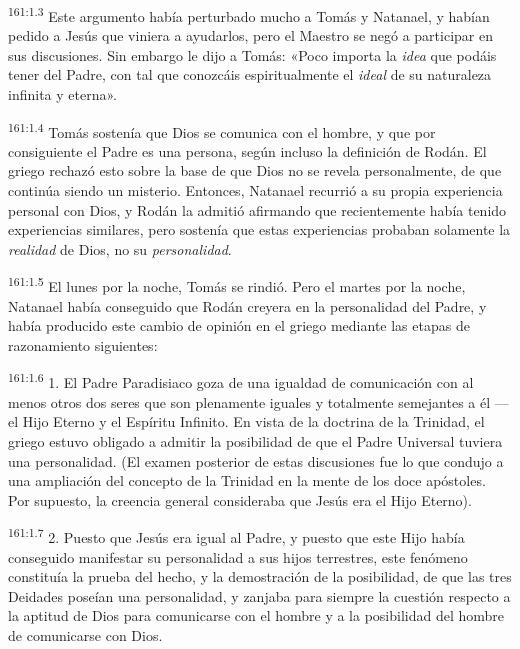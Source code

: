 \par 
\textsuperscript{161:1.3} Este argumento había perturbado mucho a Tomás y Natanael, y habían pedido a Jesús que viniera a ayudarlos, pero el Maestro se negó a participar en sus discusiones. Sin embargo le dijo a Tomás: «Poco importa la \textit{idea} que podáis tener del Padre, con tal que conozcáis espiritualmente el \textit{ideal} de su naturaleza infinita y eterna».

\par 
\textsuperscript{161:1.4} Tomás sostenía que Dios se comunica con el hombre, y que por consiguiente el Padre es una persona, según incluso la definición de Rodán. El griego rechazó esto sobre la base de que Dios no se revela personalmente, de que continúa siendo un misterio. Entonces, Natanael recurrió a su propia experiencia personal con Dios, y Rodán la admitió afirmando que recientemente había tenido experiencias similares, pero sostenía que estas experiencias probaban solamente la \textit{realidad} de Dios, no su \textit{personalidad}.

\par 
\textsuperscript{161:1.5} El lunes por la noche, Tomás se rindió. Pero el martes por la noche, Natanael había conseguido que Rodán creyera en la personalidad del Padre, y había producido este cambio de opinión en el griego mediante las etapas de razonamiento siguientes:

\par 
\textsuperscript{161:1.6} 1. El Padre Paradisiaco goza de una igualdad de comunicación con al menos otros dos seres que son plenamente iguales y totalmente semejantes a él ---el Hijo Eterno y el Espíritu Infinito. En vista de la doctrina de la Trinidad, el griego estuvo obligado a admitir la posibilidad de que el Padre Universal tuviera una personalidad. (El examen posterior de estas discusiones fue lo que condujo a una ampliación del concepto de la Trinidad en la mente de los doce apóstoles. Por supuesto, la creencia general consideraba que Jesús era el Hijo Eterno).

\par 
\textsuperscript{161:1.7} 2. Puesto que Jesús era igual al Padre, y puesto que este Hijo había conseguido manifestar su personalidad a sus hijos terrestres, este fenómeno constituía la prueba del hecho, y la demostración de la posibilidad, de que las tres Deidades poseían una personalidad, y zanjaba para siempre la cuestión respecto a la aptitud de Dios para comunicarse con el hombre y a la posibilidad del hombre de comunicarse con Dios.

